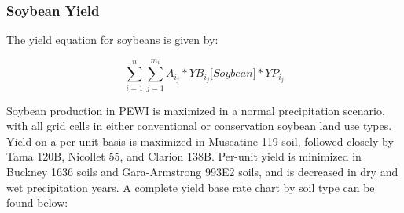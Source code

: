\documentclass[11pt]{article}
\begin{document}
\subsubsection{Soybean Yield}
The yield equation for soybeans is given by:

$$\sum_{i=1}^{n} \sum_{j=1}^{m_i} A_i_j *YB_i_j\bigg[Soybean\bigg]*YP_i_j$$

Soybean production in PEWI is maximized in a normal precipitation scenario, with all grid cells in either conventional or conservation soybean land use types. Yield on a per-unit basis is maximized in Muscatine 119 soil, followed closely by Tama 120B, Nicollet 55, and Clarion 138B. Per-unit yield is minimized in Buckney 1636 soils and Gara-Armstrong 993E2 soils, and is decreased in dry and wet precipitation years. A complete yield base rate chart by soil type can be found below:
\end{document}
